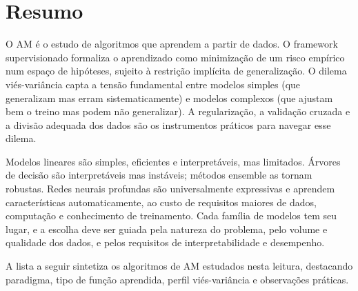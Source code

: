 \documentclass[12pt,a4paper]{article}
\begin{document}
\section{Resumo}
\label{sec:resumo}

O AM é o estudo de algoritmos que aprendem a partir de dados. O framework supervisionado formaliza o aprendizado como minimização de um risco empírico num espaço de hipóteses, sujeito à restrição implícita de generalização. O dilema viés-variância capta a tensão fundamental entre modelos simples (que generalizam mas erram sistematicamente) e modelos complexos (que ajustam bem o treino mas podem não generalizar). A regularização, a validação cruzada e a divisão adequada dos dados são os instrumentos práticos para navegar esse dilema.

Modelos lineares são simples, eficientes e interpretáveis, mas limitados. Árvores de decisão são interpretáveis mas instáveis; métodos ensemble as tornam robustas. Redes neurais profundas são universalmente expressivas e aprendem características automaticamente, ao custo de requisitos maiores de dados, computação e conhecimento de treinamento. Cada família de modelos tem seu lugar, e a escolha deve ser guiada pela natureza do problema, pelo volume e qualidade dos dados, e pelos requisitos de interpretabilidade e desempenho.

A lista a seguir sintetiza os algoritmos de AM estudados nesta leitura, destacando paradigma, tipo de função aprendida, perfil viés-variância e observações práticas.
\end{document}
